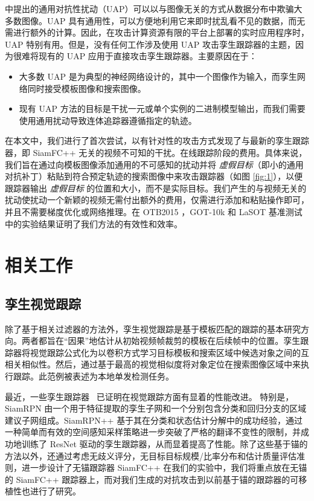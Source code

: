 \cite{UAP} 中提出的通用对抗性扰动（UAP）可以以与图像无关的方式从数据分布中欺骗大多数图像。UAP 具有通用性，可以方便地利用它来即时扰乱看不见的数据，而无需进行额外的计算。因此，在攻击计算资源有限的平台上部署的实时应用程序时，UAP 特别有用。但是，没有任何工作涉及使用 UAP 攻击孪生跟踪器的主题，因为很难将现有的 UAP 应用于直接攻击孪生跟踪器。主要原因在于：
\begin{itemize}
\item 大多数 UAP 是为典型的神经网络设计的，其中一个图像作为输入，而孪生网络同时接受模板图像和搜索图像。
\item 现有 UAP 方法的目标是干扰一元或单个实例的二进制模型输出，而我们需要使用通用扰动导致连体追踪器遵循指定的轨迹。
\end{itemize}

在本文中，我们进行了首次尝试，以有针对性的攻击方式发现了与最新的孪生跟踪器，即 SiamFC++ \cite{SiamFC++}无关的视频不可知的干扰。在线跟踪阶段的费用。具体来说，我们旨在通过向模板图像添加通用的不可感知的扰动并将 \textit{虚假目标}（即小的通用对抗补丁）粘贴到符合预定轨迹的搜索图像中来攻击跟踪器（如图 \ref{fig:1}），以便跟踪器输出 \textit{虚假目标} 的位置和大小，而不是实际目标。我们产生的与视频无关的扰动使扰动一个新颖的视频无需付出额外的费用，仅需进行添加和粘贴操作即可，并且不需要梯度优化或网络推理。在 OTB2015 \cite{OTB}，GOT-10k \cite{GOT-10k} 和 LaSOT \cite{LaSOT} 基准测试中的实验结果证明了我们方法的有效性和效率。

\section{相关工作}

\subsection{孪生视觉跟踪}

除了基于相关过滤器的方法外，孪生视觉跟踪是基于模板匹配的跟踪的基本研究方向。两者都旨在“因果”地估计从初始视频帧裁剪的模板在后续帧中的位置。孪生跟踪器将视觉跟踪公式化为以卷积方式学习目标模板和搜索区域中候选对象之间的互相关相似性。然后，通过基于最高的视觉相似度将对象定位在搜索图像区域中来执行跟踪。此范例被表述为本地单发检测任务。

最近，一些孪生跟踪器~\cite{SiamRPN,SiamRPN++,SiamFC++} 已证明在视觉跟踪方面有显着的性能改进。
特别是，SiamRPN \cite{SiamRPN} 由一个用于特征提取的孪生子网和一个分别包含分类和回归分支的区域建议子网组成。SiamRPN++ \cite{SiamRPN++} 基于其在分类和状态估计分解中的成功经验，通过一种简单而有效的空间感知采样策略进一步突破了严格的翻译不变性的限制，并成功地训练了 ResNet 驱动的孪生跟踪器，从而显着提高了性能。除了这些基于锚的方法以外，还通过考虑无歧义评分，无目标目标规模/比率分布和估计质量评估准则，进一步设计了无锚跟踪器 SiamFC++ \cite{SiamFC++} 在我们的实验中，我们将重点放在无锚的 SiamFC++ 跟踪器上，而对我们生成的对抗攻击到以前基于锚的跟踪器的可移植性也进行了研究。

